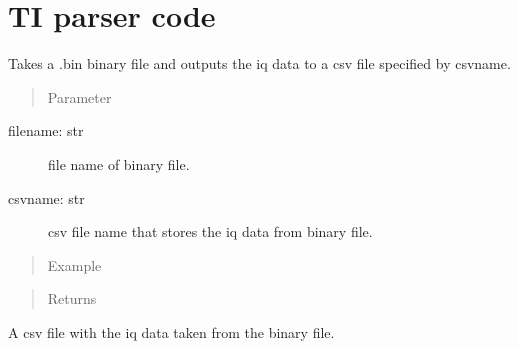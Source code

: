 \documentclass[letterpaper,10pt,english]{sphinxmanual}
\begin{document}
\section{TI parser code}
\label{\detokenize{TI parser:module-TI_parser}}\label{\detokenize{TI parser:ti-parser-code}}\label{\detokenize{TI parser::doc}}

\begin{fulllineitems}
\label{\detokenize{TI parser:TI_parser.readTIdata}}
Takes a .bin binary file and outputs the iq data to a csv file specified by csvname.
\begin{quote}\begin{description}
\item[{Parameter}] \leavevmode
\end{description}\end{quote}
\begin{description}
\item[{filename: str}] \leavevmode
file name of binary file.

\item[{csvname: str}] \leavevmode
csv file name that stores the iq data from binary file.

\end{description}
\begin{quote}\begin{description}
\item[{Example}] \leavevmode
\end{description}\end{quote}

%
\begin{sphinxVerbatim}[commandchars=\\\{\}]
\end{sphinxVerbatim}
\begin{quote}\begin{description}
\item[{Returns}] \leavevmode


\end{description}\end{quote}

A csv file with the iq data taken from the binary file.

\end{fulllineitems}
\end{document}
